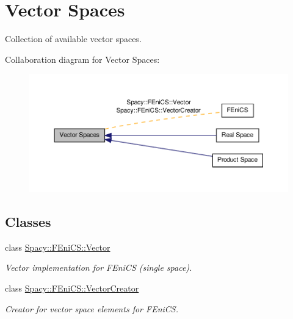 \hypertarget{group__VectorSpaceGroup}{\section{\-Vector \-Spaces}
\label{group__VectorSpaceGroup}
}


\-Collection of available vector spaces.  


\-Collaboration diagram for \-Vector \-Spaces\-:
\nopagebreak
\begin{figure}[H]
\begin{center}
\leavevmode
\includegraphics[width=350pt]{group__VectorSpaceGroup}
\end{center}
\end{figure}
\subsection*{\-Classes}
\begin{DoxyCompactItemize}
\item 
class \hyperlink{classSpacy_1_1FEniCS_1_1Vector}{\-Spacy\-::\-F\-Eni\-C\-S\-::\-Vector}
\begin{DoxyCompactList}\small\item\em \-Vector implementation for \-F\-Eni\-C\-S (single space). \end{DoxyCompactList}\item 
class \hyperlink{classSpacy_1_1FEniCS_1_1VectorCreator}{\-Spacy\-::\-F\-Eni\-C\-S\-::\-Vector\-Creator}
\begin{DoxyCompactList}\small\item\em \-Creator for vector space elements for \-F\-Eni\-C\-S. \end{DoxyCompactList}\end{DoxyCompactItemize}
